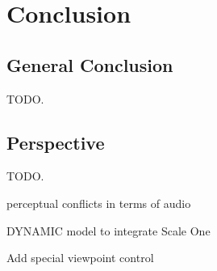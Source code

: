 \chapter*{Conclusion}
{}

\section*{General Conclusion}
TODO.

\section*{Perspective}
TODO.

perceptual conflicts in terms of audio

DYNAMIC model to integrate Scale One

Add special viewpoint control
